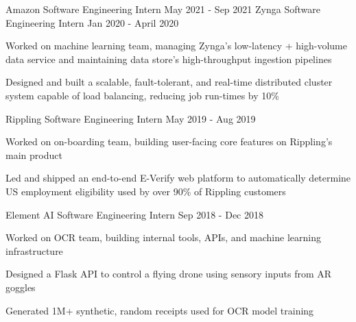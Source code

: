 \documentclass[11pt, a4paper]{awesome-cv}
\begin{document}
\makecvheader



\begin{siderules1}
\begin{cventries}
    \cventry
    {\textit{}}
    {Amazon}
    {Software Engineering Intern}
    {May 2021 - Sep 2021}
    {
    }
    \cventry
    {\textit{}}
    {Zynga}
    {Software Engineering Intern}
    {Jan 2020 - April 2020}
    {
      \begin{cvitems}
        \item {Worked on machine learning team, managing Zynga’s low-latency + high-volume data service and maintaining data store’s high-throughput ingestion pipelines}
        \item {Designed and built a scalable, fault-tolerant, and real-time distributed cluster system capable of load balancing, reducing job run-times by 10\%}
      \end{cvitems}
    }
    \cventry
    {\textit{}}
    {Rippling}
    {Software Engineering Intern}
    {May 2019 - Aug 2019}
    {
      \begin{cvitems}
        \item {Worked on on-boarding team, building user-facing core features on Rippling’s main product}
        \item {Led and shipped an end-to-end E-Verify web platform to automatically determine US employment eligibility used by over 90\% of Rippling customers}
      \end{cvitems}
    }
    \cventry
    {\textit{}}
    {Element AI}
    {Software Engineering Intern}
    {Sep 2018 - Dec 2018}
    {
      \begin{cvitems}
        \item {Worked on OCR team, building internal tools, APIs, and machine learning infrastructure}
        \item {Designed a Flask API to control a flying drone using sensory inputs from AR goggles}
        \item {Generated 1M+ synthetic, random receipts used for OCR model training}
      \end{cvitems}
}
\end{cventries}
\end{siderules1}
\end{document}
